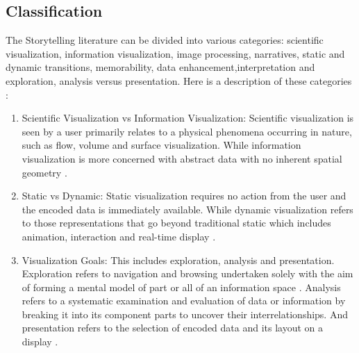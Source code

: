\documentclass{egpubl}
\begin{document}
\subsection{Classification}
The Storytelling literature can be divided into various categories: scientific visualization, information visualization, image processing, narratives, static and dynamic transitions, memorability, data enhancement,interpretation and exploration, analysis versus presentation. Here is a description of these categories :
\begin{enumerate}
\item Scientific Visualization vs Information Visualization: Scientific visualization is seen by a user primarily relates to a physical phenomena occurring in nature, such as flow, volume and surface visualization. While information visualization is more concerned with abstract data with no inherent spatial geometry \cite{spence2007}.
\item Static vs Dynamic: Static visualization requires no action from the user and the encoded data is immediately available. While dynamic visualization refers to those representations that go beyond traditional static which includes animation, interaction and real-time display \cite{spence2007}.
\item Visualization Goals: This includes exploration, analysis and presentation. Exploration refers to navigation and browsing undertaken solely with the aim of forming a mental model of part or all of an information space \cite{spence2007}. Analysis refers to a systematic examination and evaluation of data or information by breaking it into its component parts to uncover their interrelationships. And presentation refers to the selection of encoded data and its layout on a display \cite{spence2007}.
\end{enumerate}
\end{document}
